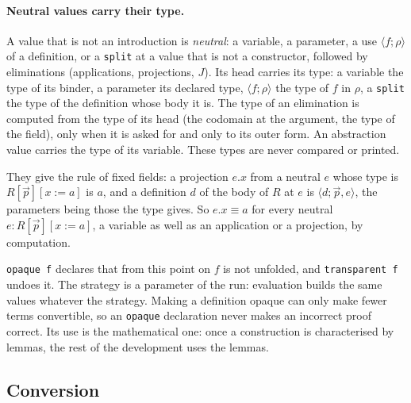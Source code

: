\documentclass[11pt]{article}
\newcommand{\kw}[1]{\texttt{#1}}
\begin{document}
\paragraph{Neutral values carry their type.}\label{sec:values} A value
that is not an introduction is \emph{neutral}: a variable, a parameter, a
use $\langle f;\rho\rangle$ of a definition, or a \kw{split} at a value
that is not a constructor, followed by eliminations (applications,
projections, $J$). Its head carries its type: a variable the type of its
binder, a parameter its declared type, $\langle f;\rho\rangle$ the type of
$f$ in $\rho$, a \kw{split} the type of the definition whose body it is.
The type of an elimination is computed from the type of its head (the
codomain at the argument, the type of the field), only when it is asked
for and only to its outer form. An abstraction value carries the type of
its variable. These types are never compared or printed.

They give the rule of fixed fields: a projection $e.x$ from a neutral $e$
whose type is $R[\vec p][x:=a]$ is $a$, and a definition $d$ of the body
of $R$ at $e$ is $\langle d;\vec p,e\rangle$, the parameters being those
the type gives. So $e.x\equiv a$ for every neutral $e : R[\vec p][x:=a]$,
a variable as well as an application or a projection, by computation.

\kw{opaque f} declares that from this point on $f$ is not unfolded, and
\kw{transparent f} undoes it.
The strategy is a parameter of the run:
evaluation builds the same values whatever the strategy. Making a
definition opaque can only make fewer terms convertible, so an
\kw{opaque} declaration never makes an incorrect proof correct. Its use
is the mathematical one: once a construction is characterised by lemmas,
the rest of the development uses the lemmas.

\subsection{Conversion}\label{sec:conv}
\end{document}
